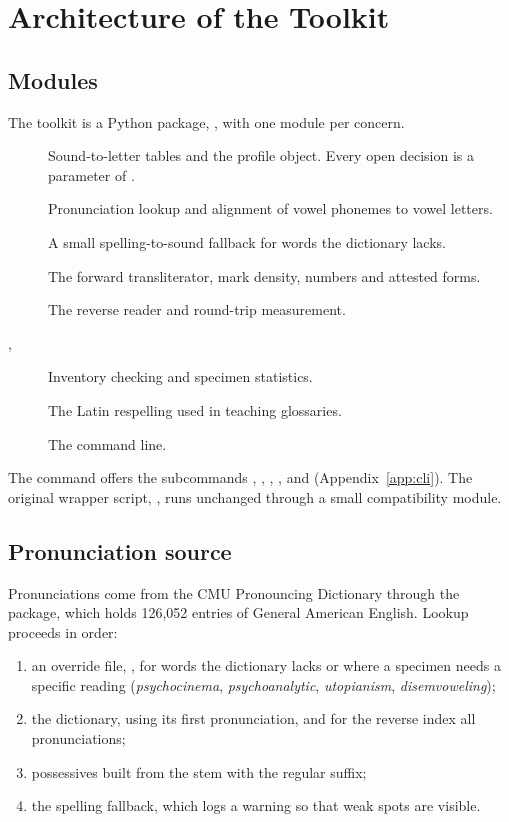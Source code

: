 \chapter{Architecture of the Toolkit}

\section{Modules}
The toolkit is a Python package, , with one module per concern.

\begin{description}
\item[] Sound-to-letter tables and the profile object. Every open decision is a parameter of .
\item[] Pronunciation lookup and alignment of vowel phonemes to vowel letters.
\item[] A small spelling-to-sound fallback for words the dictionary lacks.
\item[] The forward transliterator, mark density, numbers and attested forms.
\item[] The reverse reader and round-trip measurement.
\item[, ] Inventory checking and specimen statistics.
\item[] The Latin respelling used in teaching glossaries.
\item[] The command line.
\end{description}

The command  offers the subcommands , , , ,  and  (Appendix~\ref{app:cli}). The original wrapper script, , runs unchanged through a small compatibility module.

\section{Pronunciation source}
Pronunciations come from the CMU Pronouncing Dictionary through the  package, which holds 126,052 entries of General American English. Lookup proceeds in order:
\begin{enumerate}
\item an override file, , for words the dictionary lacks or where a specimen needs a specific reading (\emph{psychocinema}, \emph{psychoanalytic}, \emph{utopianism}, \emph{disemvoweling});
\item the dictionary, using its first pronunciation, and for the reverse index all pronunciations;
\item possessives built from the stem with the regular suffix;
\item the spelling fallback, which logs a warning so that weak spots are visible.
\end{enumerate}

